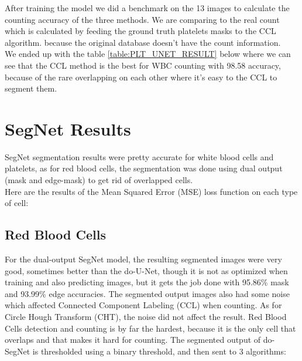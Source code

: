 After training the model we did a benchmark on the 13 images to calculate the counting accuracy of the three methods.
We are comparing to the real count which is calculated by feeding the ground truth platelets masks to the CCL algorithm. because the original database doesn't have the count information.\\
We ended up with the table \ref{table:PLT_UNET_RESULT} below where we can see that the CCL method is the best for WBC counting with 98.58 accuracy, because of the rare overlapping on each other where it’s easy to the CCL to segment them.



\section{SegNet Results}
\hspace{\parindent}
SegNet segmentation results were pretty accurate for white blood cells and platelets, as for red blood cells, the segmentation was done using dual output (mask and edge-mask) to get rid of overlapped cells.\\
Here are the results of the Mean Squared Error (MSE) loss function on each type of cell:



\subsection{Red Blood Cells}
\hspace{\parindent}
For the dual-output SegNet model, the resulting segmented images were very good, sometimes better than the do-U-Net, though it is not as optimized when training and also predicting images, but it gets the job done with 95.86\% mask and 93.99\% edge accuracies. The segmented output images also had some noise which affected Connected Component Labeling (CCL) when counting.
As for Circle Hough Transform (CHT), the noise did not affect the result.
Red Blood Cells detection and counting is by far the hardest, because it is the only cell that overlaps and that makes it hard for counting.
The segmented output of do-SegNet is thresholded using a binary threshold, and then sent to 3 algorithms:

